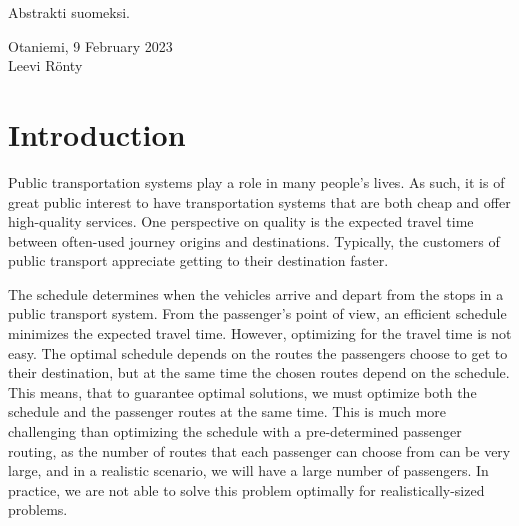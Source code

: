 \documentclass[english, 12pt, a4paper, sci, utf8, a-2b, online]{aaltothesis}
\date{9 February 2023}
\begin{document}
\makecoverpage
\makecopyrightpage
\clearpage

\begin{abstractpage}[english]
    \abstracttext{}
\end{abstractpage}


\newpage
{}
\date{9.2.2023}
\begin{abstractpage}[finnish]
    Abstrakti suomeksi.
\end{abstractpage}


\newpage


\dothesispagenumbering{}


\vspace{5cm}
Otaniemi, 9 February 2023\\

\vspace{5mm}
{\hfill Leevi Rönty \hspace{1cm}}

\newpage
\thesistableofcontents

\cleardoublepage
\section{Introduction}
\label{sec:intro}

Public transportation systems play a role in many people's lives. As such, it is of great public interest to have transportation systems that are both cheap and offer high-quality services. One perspective on quality is the expected travel time between often-used journey origins and destinations. Typically, the customers of public transport appreciate getting to their destination faster. 

The schedule determines when the vehicles arrive and depart from the stops in a public transport system. From the passenger's point of view, an efficient schedule minimizes the expected travel time. However, optimizing for the travel time is not easy. The optimal schedule depends on the routes the passengers choose to get to their destination, but at the same time the chosen routes depend on the schedule. This means, that to guarantee optimal solutions, we must optimize both the schedule and the passenger routes at the same time. This is much more challenging than optimizing the schedule with a pre-determined passenger routing, as the number of routes that each passenger can choose from can be very large, and in a realistic scenario, we will have a large number of passengers. In practice, we are not able to solve this problem optimally for realistically-sized problems.
\end{document}
